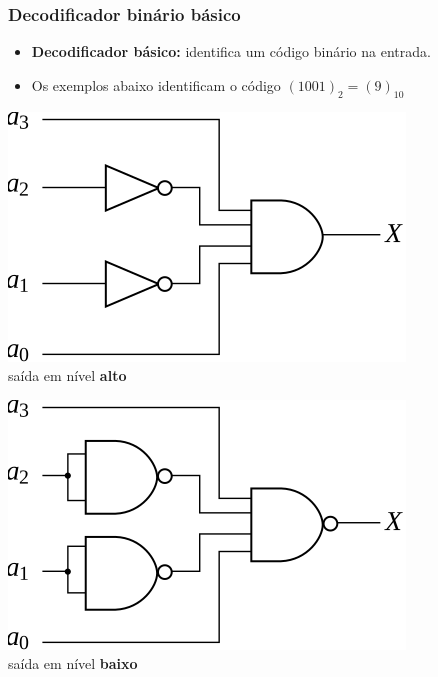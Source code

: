 \documentclass{beamer}
\begin{document}
\begin{frame}
\frametitle{Decodificador binário básico}

\begin{itemize}
\item \textbf{Decodificador básico:} identifica um código binário na entrada.
\pause
\item Os exemplos abaixo identificam o código $(1001)_2 = (9)_{10}$
\end{itemize}

\vspace{12pt}

\begin{minipage}{0.47\textwidth}
\includegraphics{images/exemplo1}\\
saída em nível \textbf{alto}
\end{minipage}\pause
\hfill
\begin{minipage}{0.47\textwidth}
\includegraphics{images/exemplo2}\\
saída em nível \textbf{baixo}
\end{minipage}
\end{frame}
\end{document}
